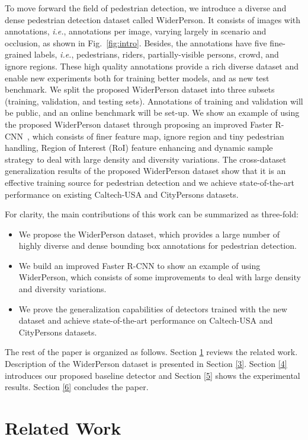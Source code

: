 \documentclass[journal]{IEEEtran}
\def\ie{{\em i.e.}}
\begin{document}
To move forward the field of pedestrian detection, we introduce a diverse and dense pedestrian detection dataset called WiderPerson. It consists of  images with  annotations, \ie,  annotations per image, varying largely in scenario and occlusion, as shown in Fig.~\ref{fig:intro}. Besides, the annotations have five fine-grained labels, \ie, pedestrians, riders, partially-visible persons, crowd, and ignore regions. These high quality annotations provide a rich diverse dataset and enable new experiments both for training better models, and as new test benchmark. We split the proposed WiderPerson dataset into three subsets (training, validation, and testing sets). Annotations of training and validation will be public, and an online benchmark will be set-up. We show an example of using the proposed WiderPerson dataset through proposing an improved Faster R-CNN~\cite{DBLP:journals/pami/RenHG017}, which consists of finer feature map, ignore region and tiny pedestrian handling, Region of Interest (RoI) feature enhancing and dynamic sample strategy to deal with large density and diversity variations. The cross-dataset generalization results of the proposed WiderPerson dataset show that it is an effective training source for pedestrian detection and we achieve state-of-the-art performance on existing Caltech-USA and CityPersons datasets. 

For clarity, the main contributions of this work can be summarized as three-fold:
\begin{itemize}
\item We propose the WiderPerson dataset, which provides a large number of highly diverse and dense bounding box annotations for pedestrian detection. 
\item We build an improved Faster R-CNN to show an example of using WiderPerson, which consists of some improvements to deal with large density and diversity variations.
\item We prove the generalization capabilities of detectors trained with the new dataset and achieve state-of-the-art performance on Caltech-USA and CityPersons datasets.
\end{itemize}

The rest of the paper is organized as follows. Section \ref{2} reviews the related work. Description of the WiderPerson dataset is presented in Section \ref{3}. Section \ref{4} introduces our proposed baseline detector and Section \ref{5} shows the experimental results. Section \ref{6} concludes the paper.

\section{Related Work} \label{2}
\end{document}
